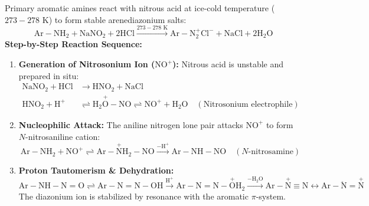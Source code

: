 \documentclass[10pt,a4paper]{article}
\begin{document}
\begin{conceptbox}
Primary aromatic amines react with nitrous acid at ice-cold temperature ($273-278\text{ K}$) to form stable arenediazonium salts:
\begin{equation}
  \mathrm{Ar-NH_2} + \mathrm{NaNO_2} + 2\mathrm{HCl} \xrightarrow{273-278\text{ K}} \mathrm{Ar-N_2^+Cl^-} + \mathrm{NaCl} + 2\mathrm{H_2O}
\end{equation}
\textbf{Step-by-Step Reaction Sequence:}
\begin{enumerate}[leftmargin=*]
  \item \textbf{Generation of Nitrosonium Ion ($\mathrm{NO^+}$):} Nitrous acid is unstable and prepared in situ:
  \begin{align*}
    \mathrm{NaNO_2} + \mathrm{HCl} &\to \mathrm{HNO_2} + \mathrm{NaCl}\\
    \mathrm{HNO_2} + \mathrm{H^+} &\rightleftharpoons \mathrm{H_2\overset{+}{O}-NO} \rightleftharpoons \mathrm{NO^+} + \mathrm{H_2O} \quad (\text{Nitrosonium electrophile})
  \end{align*}
  \item \textbf{Nucleophilic Attack:} The aniline nitrogen lone pair attacks $\mathrm{NO^+}$ to form $N$-nitrosaniline cation:
  \begin{equation}
    \mathrm{Ar-NH_2} + \mathrm{NO^+} \rightleftharpoons \mathrm{Ar-\overset{+}{N}H_2-NO} \xrightarrow{-\mathrm{H^+}} \mathrm{Ar-NH-NO} \quad (N\text{-nitrosamine})
  \end{equation}
  \item \textbf{Proton Tautomerism \& Dehydration:}
  \begin{equation}
    \mathrm{Ar-NH-N=O} \rightleftharpoons \mathrm{Ar-N=N-OH} \xrightarrow{\mathrm{H^+}} \mathrm{Ar-N=N-\overset{+}{O}H_2} \xrightarrow{-\mathrm{H_2O}} \mathrm{Ar-\overset{+}{N}\equiv N} \longleftrightarrow \mathrm{Ar-\ddot{N}=\overset{+}{N}}
  \end{equation}
  The diazonium ion is stabilized by resonance with the aromatic $\pi$-system.
\end{enumerate}
\end{conceptbox}
\end{document}
